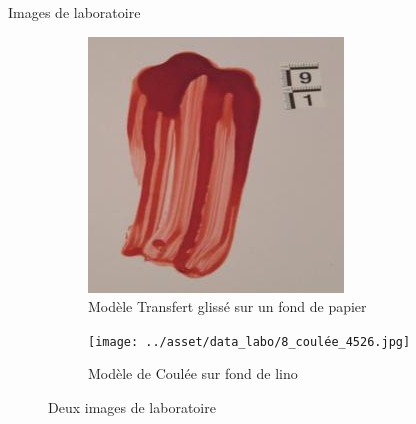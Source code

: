 \documentclass[11pt]{beamer}
\begin{document}
\begin{frame}{Images de laboratoire}
    \begin{figure}[b]
        \centering
        \begin{subfigure}{0.40\textwidth}
            \centering
            \includegraphics[width=\linewidth]{../asset/data_labo/4_papier_1586.jpg}
            \caption{Modèle Transfert glissé sur un fond de papier}
        \end{subfigure}
        \begin{subfigure}{0.40\textwidth}
            \centering
            \texttt{[image: ../asset/data\_labo/8\_coulée\_4526.jpg]}
            \caption{Modèle de Coulée sur fond de lino}
        \end{subfigure}
        \caption{Deux images de laboratoire}
        \label{fig: labs images}
    \end{figure}
\end{frame}
\end{document}

